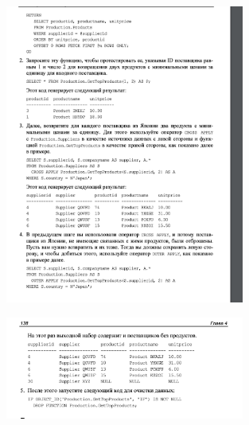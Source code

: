 \begin{figure}[h!]
	\begin{center}
		\includegraphics[width=0.7\textwidth]{img/ex9.png}
	\end{center}
	\captionsetup{justification=centering}
\end{figure}

\begin{figure}[h!]
	\begin{center}
		\includegraphics[width=0.7\textwidth]{img/ex10.png}
	\end{center}
	\captionsetup{justification=centering}
\end{figure}


